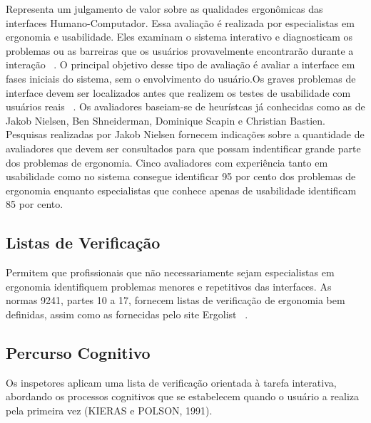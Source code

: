 	Representa um julgamento de valor sobre as qualidades ergonômicas das interfaces Humano-Computador. Essa avaliação é realizada por especialistas em ergonomia e usabilidade. Eles examinam o sistema interativo e diagnosticam os problemas ou as barreiras que os usuários provavelmente encontrarão durante a interação ~\cite{cybis2010}.
	O principal objetivo desse tipo de avaliação é avaliar a interface em fases iniciais do sistema, sem o envolvimento do usuário.Os graves problemas de interface devem ser localizados antes que realizem os testes de usabilidade com usuários reais ~\cite{santos2012}.
	Os avaliadores baseiam-se de heurístcas já conhecidas como as de Jakob Nielsen, Ben Shneiderman, Dominique Scapin e Christian Bastien.
	Pesquisas realizadas por Jakob Nielsen fornecem indicações sobre a quantidade de avaliadores que devem ser consultados para que possam indentificar grande parte dos problemas de ergonomia. Cinco avaliadores com experiência tanto em usabilidade como no sistema consegue identificar 95 por cento dos problemas de ergonomia enquanto especialistas que conhece apenas de usabilidade identificam 85 por cento.


	

\subsection{Listas de Verificação}

	Permitem que profissionais que não necessariamente sejam especialistas em ergonomia identifiquem problemas menores e repetitivos das interfaces. As normas 9241, partes 10 a 17, fornecem listas de verificação de ergonomia bem definidas, assim como as fornecidas pelo site Ergolist ~\cite{cybis2010}.
	
	

\subsection{Percurso Cognitivo}

Os inspetores aplicam uma lista de verificação orientada à tarefa interativa, abordando os processos cognitivos que se estabelecem quando o usuário a realiza pela primeira vez (KIERAS e POLSON, 1991).
	


